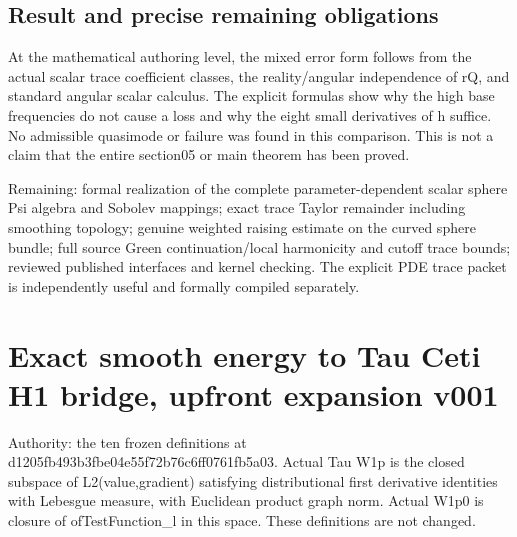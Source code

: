 \documentclass[11pt]{article}
\theoremstyle{definition}
\theoremstyle{remark}
\numberwithin{equation}{section}
\begin{document}
\hypertarget{source-71285ede3265-result-and-precise-remaining-obligations}{%
\subsection{Result and precise remaining
obligations}\label{source-71285ede3265-result-and-precise-remaining-obligations}}

At the mathematical authoring level, the mixed error form follows from
the actual scalar trace coefficient classes, the reality/angular
independence of rQ, and standard angular scalar calculus. The explicit
formulas show why the high base frequencies do not cause a loss and why
the eight small derivatives of h suffice. No admissible quasimode or
failure was found in this comparison. This is not a claim that the
entire section05 or main theorem has been proved.

Remaining: formal realization of the complete parameter-dependent scalar
sphere Psi algebra and Sobolev mappings; exact trace Taylor remainder
including smoothing topology; genuine weighted raising estimate on the
curved sphere bundle; full source Green continuation/local harmonicity
and cutoff trace bounds; reviewed published interfaces and kernel
checking. The explicit PDE trace packet is independently useful and
formally compiled separately.

\clearpage
\hypertarget{source-f2cf9891ff40-exact-smooth-energy-to-tau-ceti-h1-bridge-upfront-expansion-v001}{%
\section{Exact smooth energy to Tau Ceti H1 bridge, upfront expansion
v001}\label{source-f2cf9891ff40-exact-smooth-energy-to-tau-ceti-h1-bridge-upfront-expansion-v001}}

Authority: the ten frozen definitions at
d1205fb493b3fbe04e55f72b76c6ff0761fb5a03. Actual Tau W1p is the closed
subspace of L2(value,gradient) satisfying distributional first
derivative identities with Lebesgue measure, with Euclidean product
graph norm. Actual W1p0 is closure of ofTestFunction\_l in this space.
These definitions are not changed.
\end{document}
